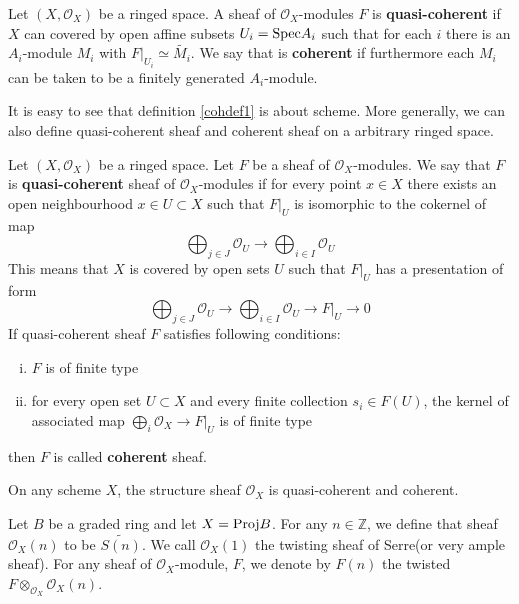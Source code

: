 \begin{mydefn}
\label{cohdef1}
Let $(X, \mathcal{O}_{X})$ be a ringed space. A sheaf of $\mathcal{O}_{X}$-modules $F$ is \textbf{quasi-coherent} if $X$ can covered by open affine subsets $U_{i} = \text{Spec} A_{i}$ such that for each $i$ there is an $A_i$-module $M_i$ with $F|_{U_i} \simeq \widetilde{M_i}$. We say that is \textbf{coherent} if furthermore each $M_i$ can be taken to be a finitely generated $A_i$-module.
\end{mydefn}
It is easy to see that definition \ref{cohdef1} is about scheme. More generally, we can also define quasi-coherent sheaf and coherent sheaf on a arbitrary ringed space.
\begin{mydefn}
\label{cohdef2}
Let $(X, \mathcal{O}_{X})$ be a ringed space. Let $F$ be a sheaf of $\mathcal{O}_X$-modules. We say that $F$ is \textbf{quasi-coherent} sheaf of $\mathcal{O}_X$-modules if for every point $x\in X$ there exists an open neighbourhood $x \in U \subset X$ such that $F|_{U}$ is isomorphic to the cokernel of map
\[
\bigoplus_{j \in J} \mathcal{O}_{U} \rightarrow \bigoplus_{i \in I} \mathcal{O}_{U}
\]
This means that $X$ is covered by open sets $U$ such that $F|_{U}$ has a presentation of form
\[
\bigoplus_{j \in J} \mathcal{O}_U \rightarrow \bigoplus_{i \in I} \mathcal{O}_U \rightarrow F|_U \rightarrow 0
\]
If quasi-coherent sheaf $F$ satisfies following conditions:
\begin{enumerate}[(i)]
    \item $F$ is of finite type
    \item for every open set  $U \subset X$ and every finite collection $s_i \in F(U)$, the kernel of associated map $\bigoplus_{i} \mathcal{O}_X \rightarrow F|_U$ is of finite type
\end{enumerate}
then $F$ is called \textbf{coherent} sheaf.
\end{mydefn}
\begin{ex}
On any scheme $X$, the structure sheaf $\mathcal{O}_X$ is quasi-coherent and coherent.
\end{ex}

\begin{mydefn}
Let $B$ be a graded ring and let $X= \text{Proj} B$. For any $n \in \mathbb{Z}$, we define that sheaf $\mathcal{O}_X(n)$ to be $\widetilde{S(n)}$. We call $\mathcal{O}_{X}(1)$ the twisting sheaf of Serre(or very ample sheaf). For any sheaf of $\mathcal{O}_X$-module, $F$, we denote by $F(n)$ the twisted $F \otimes_{\mathcal{O}_X} \mathcal{O}_{X}(n)$.
\end{mydefn}
